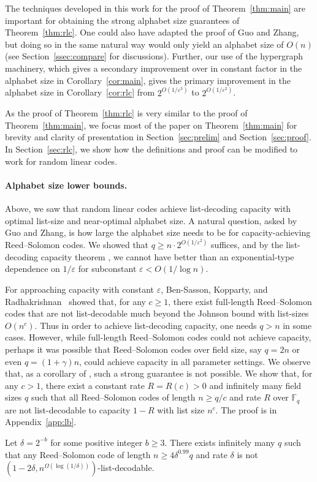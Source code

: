 \documentclass{article}[11pt]
\begin{document}
The techniques developed in this work for the proof of Theorem~\ref{thm:main} are important for obtaining the strong alphabet size guarantees of Theorem~\ref{thm:rlc}.
One could also have adapted the proof of Guo and Zhang, but doing so in the same natural way would only yield an alphabet size of $O(n)$ (see Section~\ref{ssec:compare} for discussions).
Further, our use of the hypergraph machinery, which gives a secondary improvement over \cite{GZ23} in constant factor in the alphabet size in Corollary~\ref{cor:main}, gives the primary improvement in the alphabet size in Corollary~\ref{cor:rlc} from $2^{O(1/\varepsilon^3)}$ to $2^{O(1/\varepsilon^2)}$. 

As the proof of Theorem~\ref{thm:rlc} is very similar to the proof of Theorem~\ref{thm:main}, we focus most of the paper on Theorem~\ref{thm:main} for brevity and clarity of presentation in Section~\ref{sec:prelim} and Section~\ref{sec:proof}.
In Section~\ref{sec:rlc}, we show how the definitions and proof can be modified to work for random linear codes.


\paragraph{Alphabet size lower bounds.}
Above, we saw that random linear codes achieve list-decoding capacity with optimal list-size and near-optimal alphabet size.
A natural question, asked by Guo and Zhang, is how large the alphabet size needs to be for capacity-achieving Reed--Solomon codes. We showed that $q\ge n\cdot 2^{O(1/\varepsilon^2)}$ suffices, and by the list-decoding capacity theorem \cite{Elias57,Wozencraft58}, we cannot have better than an exponential-type dependence on $1/\varepsilon$ for subconstant $\varepsilon < O(1/\log n)$.

For approaching capacity with constant $\varepsilon$, Ben-Sasson, Kopparty, and Radhakrishnan~\cite{BKR10} showed that, for any $c\ge 1$, there exist full-length Reed--Solomon codes that are not list-decodable much beyond the Johnson bound with list-sizes $O(n^c)$. Thus in order to achieve list-decoding capacity, one needs $q>n$ in some cases.
However, while full-length Reed--Solomon codes could not achieve capacity, perhaps it was possible that Reed--Solomon codes over field size, say $q=2n$ or even $q=(1+\gamma)n$, could achieve capacity in all parameter settings.
We observe that, as a corollary of \cite{BKR10}, such a strong guarantee is not possible.
We show that, for any $c>1$, there exist a constant rate $R=R(c)>0$ and infinitely many field sizes $q$ such that all Reed--Solomon codes of length $n\ge q/c$ and rate $R$ over $\mathbb{F}_q$ are not list-decodable to capacity $1-R$ with list size $n^c$. The proof is in Appendix~\ref{app:lb}.
\begin{proposition}
  Let $\delta=2^{-b}$ for some positive integer $b\ge 3$.
  There exists infinitely many $q$ such that any Reed--Solomon code of length $n\ge 4\delta^{0.99}q$ and rate $\delta$ is not $(1-2\delta,n^{\Omega(\log(1/\delta))})$-list-decodable.
  \label{pr:lb}
\end{proposition}
\end{document}
